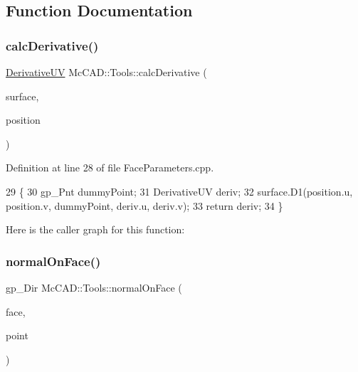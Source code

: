 \subsection{Function Documentation}
\mbox{\label{namespaceMcCAD_1_1Tools_a4bc929678a434c45096f3816af9143ad}} 
\subsubsection{\texorpdfstring{calc\+Derivative()}{calcDerivative()}}
{\footnotesize\ttfamily \hyperlink{structMcCAD_1_1Tools_1_1DerivativeUV}{Derivative\+UV} Mc\+C\+A\+D\+::\+Tools\+::calc\+Derivative (\begin{DoxyParamCaption}\item[{const B\+Rep\+Adaptor\+\_\+\+Surface \&}]{surface,  }\item[{const \hyperlink{structMcCAD_1_1Tools_1_1PositionUV}{Position\+UV} \&}]{position }\end{DoxyParamCaption})}



Definition at line 28 of file Face\+Parameters.\+cpp.


\begin{DoxyCode}
29                                                         \{
30     gp\_Pnt dummyPoint;
31     DerivativeUV deriv;
32     surface.D1(position.u, position.v, dummyPoint, deriv.u, deriv.v);
33     \textcolor{keywordflow}{return} deriv;
34 \}
\end{DoxyCode}
Here is the caller graph for this function\+:
\mbox{\label{namespaceMcCAD_1_1Tools_a5e0090a8dd0489c030624ee30a098110}} 
\subsubsection{\texorpdfstring{normal\+On\+Face()}{normalOnFace()}\hspace{0.1cm}{\footnotesize\ttfamily [1/2]}}
{\footnotesize\ttfamily gp\+\_\+\+Dir Mc\+C\+A\+D\+::\+Tools\+::normal\+On\+Face (\begin{DoxyParamCaption}\item[{const Topo\+D\+S\+\_\+\+Face \&}]{face,  }\item[{const gp\+\_\+\+Pnt \&}]{point }\end{DoxyParamCaption})}



